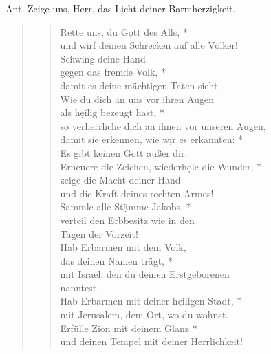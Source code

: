

\def\greinitialformat#1{{\fontsize{40}{40}\selectfont #1}}
\gresetfirstlineaboveinitial{\small \textcolor{red}{Sir 36}}{}
\setaboveinitialseparation{0.72mm}

\medskip

\begin{sloppypar}
{\noindent\rm{Ant. Zeige uns, Herr, das Licht deiner Barmherzigkeit.}} 
\end{sloppypar}

\medskip
\medskip




\begin{quote}
\begin{verse}
Rette uns, du G\d ott des Alls, *\\  
und wirf deinen Schrecken auf alle Völker!\\ 
\vin Schwing deine Hand\\ 
\vin g\d egen das fremde Volk, *\\ 
\vin damit es deine mächtigen Taten sieht.\\ 
Wie du dich an uns vor ihren Augen\\
als h\d eilig bezeugt hast, *\\ 
so verherrliche dich an ihnen vor unseren Augen,\\ 
\vin damit sie erkennen, wie w\d ir  es erkannten: *\\ 
\vin Es gibt keinen Gott außer dir.\\ 
Erneuere die Zeichen, wiederh\d ole die Wunder, *\\ 
zeige die Macht deiner Hand\\
und die Kraft deines rechten Armes!\\ 
\vin Sammle alle St\d ämme Jakobs, *\\ 
\vin verteil den Erbbesitz wie in den\\ 
\vin Tagen der Vorzeit!\\  
Hab Erbarmen mit dem Volk, \\
das d\d einen Namen trägt, *\\ 
mit Israel, den du deinen Erstgeborenen\\
nanntest.\\ 
\vin Hab Erbarmen mit deiner h\d eiligen Stadt, *\\ 
\vin mit Jerusalem, dem Ort, wo du wohnst.\\ 
Erfülle Zion mit d\d einem Glanz *\\ 
und deinen Tempel mit deiner Herrlichkeit!\\ 
\end{verse}
\end{quote}

